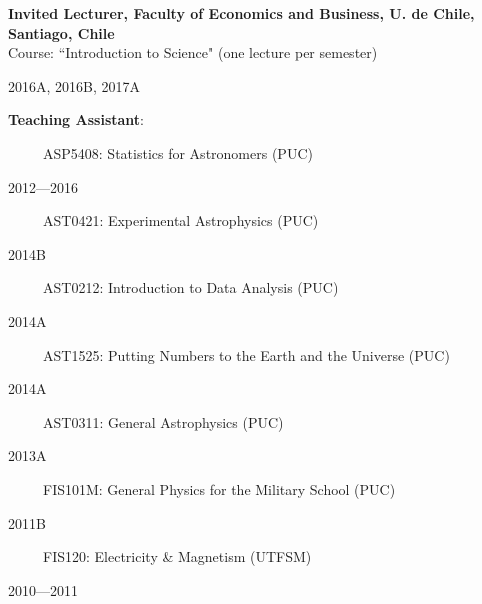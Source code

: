 \documentclass[12pt, a4paper]{article} %
\begin{document}
\begin{minipage}[t]{0.7\textwidth}
\begin{flushleft}%
  \setlength{\leftskip}{0.2cm}%
\textbf{Invited Lecturer, Faculty of Economics and Business, U. de Chile, Santiago, Chile}\\
Course: ``Introduction to Science" (one lecture per semester)
\end{flushleft}
\end{minipage}
\begin{minipage}[t]{0.3\textwidth}
\hfill 2016A, 2016B, 2017A
\end{minipage}


\begin{flushleft}%
  \setlength{\leftskip}{0.2cm}%
\textbf{Teaching Assistant}:
\end{flushleft}
\begin{minipage}[t]{0.6\textwidth}
\ \ \ \ \ ASP5408: Statistics for Astronomers (PUC)
\end{minipage}
\begin{minipage}[t]{0.4\textwidth}
\hfill 2012---2016
\end{minipage}
\begin{minipage}[t]{0.7\textwidth}
\ \ \ \ \ AST0421: Experimental Astrophysics (PUC)
\end{minipage}
\begin{minipage}[t]{0.3\textwidth}
\hfill 2014B
\end{minipage}
\begin{minipage}[t]{0.7\textwidth}
\ \ \ \ \ AST0212: Introduction to Data Analysis (PUC)
\end{minipage}
\begin{minipage}[t]{0.3\textwidth}
\hfill 2014A
\end{minipage}
\begin{minipage}[t]{0.7\textwidth}
\ \ \ \ \ AST1525: Putting Numbers to the Earth and the Universe (PUC)
\end{minipage}
\begin{minipage}[t]{0.3\textwidth}
\hfill 2014A
\end{minipage}
\begin{minipage}[t]{0.7\textwidth}
\ \ \ \ \ AST0311: General Astrophysics (PUC)
\end{minipage}
\begin{minipage}[t]{0.3\textwidth}
\hfill 2013A
\end{minipage}
\begin{minipage}[t]{0.7\textwidth}
\ \ \ \ \ FIS101M: General Physics for the Military School (PUC)
\end{minipage}
\begin{minipage}[t]{0.3\textwidth}
\hfill 2011B
\end{minipage}
\begin{minipage}[t]{0.7\textwidth}
\ \ \ \ \ FIS120: Electricity \& Magnetism (UTFSM)
\end{minipage}
\begin{minipage}[t]{0.3\textwidth}
\hfill 2010---2011
\end{minipage}
\end{document}
